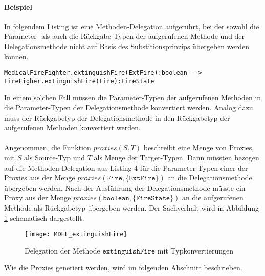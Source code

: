 \paragraph{Beispiel} In folgendem Listing ist eine Methoden-Delegation aufgerührt, bei der sowohl die Parameter- als auch die Rückgabe-Typen der aufgerufenen Methode und der Delegationsmethode nicht auf Basis des Substitionsprinzips übergeben werden können.
\begin{lstlisting}[style = dsl, caption = Methoden-Delegation mit Typkonvertierung, captionpos = b]
	MedicalFireFighter.extinguishFire(ExtFire):boolean --> FireFigher.extinguishFire(Fire):FireState
\end{lstlisting}\label{lst:methdel3}
\noindent
In einem solchen Fall müssen die Parameter-Typen der aufgerufenen Methoden in die Parameter-Typen der Delegationsmethode konvertiert werden. Analog dazu muss der Rückgabetyp der Delegationsmethode in den Rückgabetyp der aufgerufenen Methoden konvertiert werden.\\\\
Angenommen, die Funktion $\mathit{proxies(S,T)}$ beschreibt eine Menge von Proxies, mit $S$ als Source-Typ und $T$ als Menge der Target-Typen. Dann müssten bezogen auf die Methoden-Delegation aus Listing 4 für die Parameter-Typen einer der Proxies aus der Menge $\mathit{proxies(\texttt{Fire}, \{\texttt{ExtFire}\})}$ an die Delegationsmethode übergeben werden. Nach der Ausführung der Delegationsmethode müsste ein Proxy aus der Menge $\mathit{proxies(\texttt{boolean},\{\texttt{FireState}\})}$ an die aufgerufenen Methode als Rückgabetyp übergeben werden. Der Sachverhalt wird in Abbildung \ref{fig:DEL_extinguishFire} schematisch dargestellt.
\begin{figure}[H]
\texttt{[image: MDEL\_extinguishFire]}
\caption{Delegation der Methode $\texttt{extinguishFire}$ mit Typkonvertierungen}
\label{fig:DEL_extinguishFire}
\end{figure}
\noindent
Wie die Proxies generiert werden, wird im folgenden Abschnitt beschrieben.

